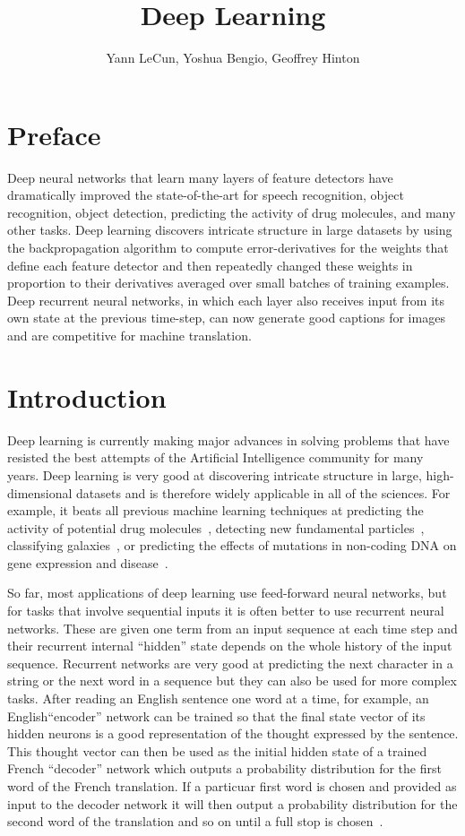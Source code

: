 \documentclass[]{article}
\title{Deep Learning}
\author{Yann LeCun, Yoshua Bengio, Geoffrey Hinton}
\begin{document}
\maketitle

\section{Preface}

Deep neural networks that learn many layers of feature detectors have dramatically improved the state-of-the-art for
speech recognition, object recognition, object detection, predicting the activity of drug molecules, and many other
tasks. Deep learning discovers intricate structure in large datasets by using the backpropagation algorithm to compute
error-derivatives for the weights that define each feature detector and then repeatedly changed these weights in
proportion to their derivatives averaged over small batches of training examples.  Deep recurrent neural networks, in which
each layer also receives input from its own state at the previous time-step, can now generate good captions for images
and are competitive for machine translation.

\section{Introduction}

Deep learning is currently making major advances in solving problems that have resisted the best attempts of the
Artificial Intelligence community for many years. Deep learning is very good at discovering intricate structure in
large, high-dimensional datasets and is therefore widely applicable in all of the sciences. For example, it beats all
previous machine learning techniques at predicting the activity of potential drug molecules~\cite{Dahl}, detecting new
fundamental particles~\cite{??}, classifying galaxies~\cite{??}, or predicting the effects of mutations in non-coding
DNA on gene expression and disease~\cite{Frey}.

So far, most applications of deep learning use feed-forward neural networks, but for tasks that involve sequential
inputs it is often better to use recurrent neural networks. These are given one term from an input sequence at each time
step and their recurrent internal ``hidden'' state depends on the whole history of the input sequence. Recurrent
networks are very good at predicting the next character in a string\cite{Sutskever} or the next word in a
sequence\cite{Mikolov} but they can also be used for more complex tasks.  After reading an English sentence one word at
a time, for example, an English``encoder'' network can be trained so that the final state vector of its hidden neurons
is a good representation of the thought expressed by the sentence.  This thought vector can then be used as the initial
hidden state of a trained French ``decoder'' network which outputs a probability distribution for the first word of the
French translation. If a particuar first word is chosen and provided as input to the decoder network it will then output
a probability distribution for the second word of the translation and so on until a full stop is chosen~\cite{Vinyals, Montreal}.
\end{document}

